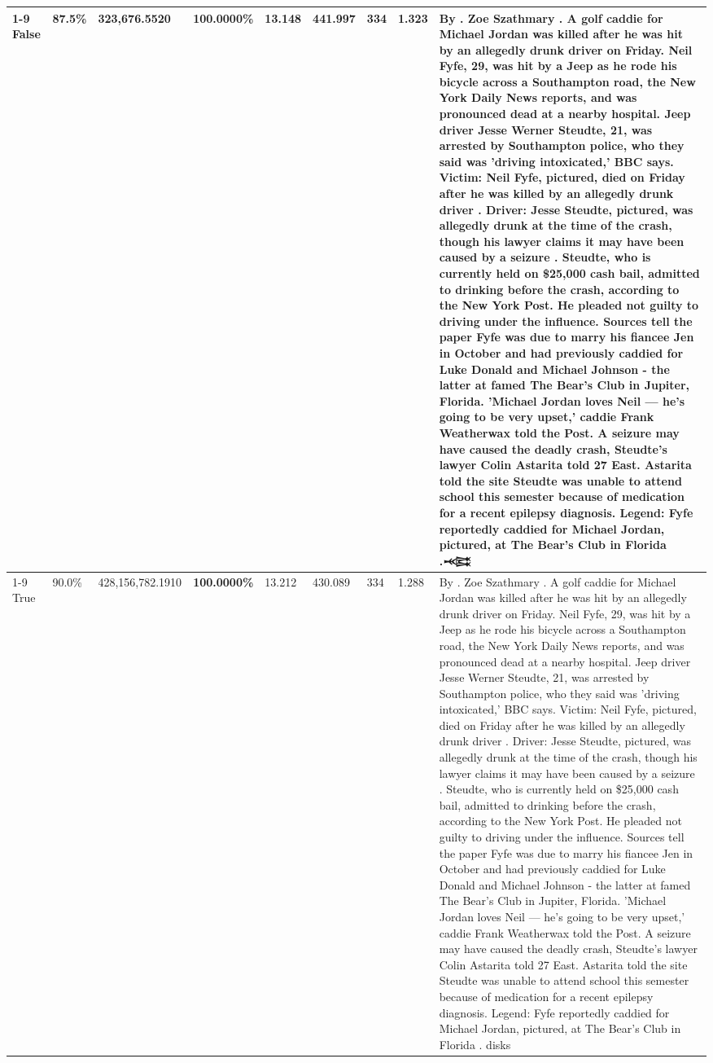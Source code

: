 \begin{table}[H]
\begin{tabular}{lllrlllll}
\cline{1-9}
False & 87.5\% & 323,676.5520 & \bfseries \color{red} 100.0000\% & 13.148 & 441.997 & 334 & 1.323 & By . Zoe Szathmary . A golf caddie for Michael Jordan was killed after he was hit by an allegedly drunk driver on Friday. Neil Fyfe, 29, was hit by a Jeep as he rode his bicycle across a Southampton road, the New York Daily News reports, and was pronounced dead at a nearby hospital. Jeep driver Jesse Werner Steudte, 21, was arrested by Southampton police, who they said was 'driving intoxicated,' BBC says. Victim: Neil Fyfe, pictured, died on Friday after he was killed by an allegedly drunk driver . Driver: Jesse Steudte, pictured, was allegedly drunk at the time of the crash, though his lawyer claims it may have been caused by a seizure . Steudte, who is currently held on \$25,000 cash bail, admitted to drinking before the crash, according to the New York Post. He pleaded not guilty to driving under the influence. Sources tell the paper Fyfe was due to marry his fiancee Jen in October and had previously caddied for Luke Donald and Michael Johnson - the latter at famed The Bear's Club in Jupiter, Florida. 'Michael Jordan loves Neil — he’s going to be very upset,' caddie Frank Weatherwax told the Post. A seizure may have caused the deadly crash, Steudte's lawyer Colin Astarita told 27 East. Astarita told the site Steudte was unable to attend school this semester because of medication for a recent epilepsy diagnosis. Legend: Fyfe reportedly caddied for Michael Jordan, pictured, at The Bear's Club in Florida .𒆛 \\
\cline{1-9}
True & 90.0\% & 428,156,782.1910 & \bfseries \color{red} 100.0000\% & 13.212 & 430.089 & 334 & 1.288 & By . Zoe Szathmary . A golf caddie for Michael Jordan was killed after he was hit by an allegedly drunk driver on Friday. Neil Fyfe, 29, was hit by a Jeep as he rode his bicycle across a Southampton road, the New York Daily News reports, and was pronounced dead at a nearby hospital. Jeep driver Jesse Werner Steudte, 21, was arrested by Southampton police, who they said was 'driving intoxicated,' BBC says. Victim: Neil Fyfe, pictured, died on Friday after he was killed by an allegedly drunk driver . Driver: Jesse Steudte, pictured, was allegedly drunk at the time of the crash, though his lawyer claims it may have been caused by a seizure . Steudte, who is currently held on \$25,000 cash bail, admitted to drinking before the crash, according to the New York Post. He pleaded not guilty to driving under the influence. Sources tell the paper Fyfe was due to marry his fiancee Jen in October and had previously caddied for Luke Donald and Michael Johnson - the latter at famed The Bear's Club in Jupiter, Florida. 'Michael Jordan loves Neil — he’s going to be very upset,' caddie Frank Weatherwax told the Post. A seizure may have caused the deadly crash, Steudte's lawyer Colin Astarita told 27 East. Astarita told the site Steudte was unable to attend school this semester because of medication for a recent epilepsy diagnosis. Legend: Fyfe reportedly caddied for Michael Jordan, pictured, at The Bear's Club in Florida . disks \\

\end{tabular}
\end{table}
